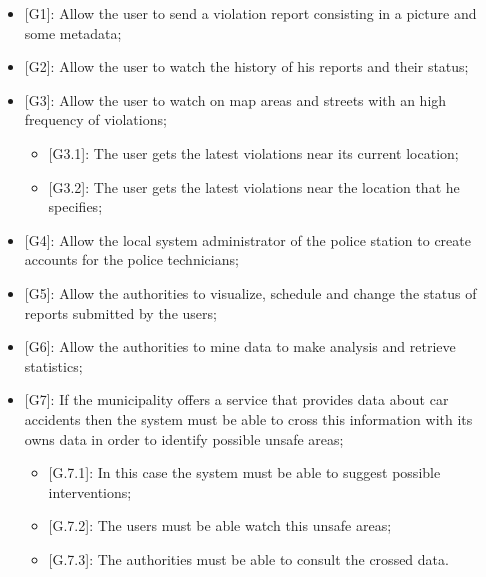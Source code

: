 \begin{itemize}  
  \item {[G1]}: Allow the user to send a violation report consisting in a picture and some metadata;
  \item {[G2]}: Allow the user to watch the history of his reports and their status;
  \item {[G3]}: Allow the user to watch on map areas and streets with an high frequency of violations;
  \begin{itemize}
    \item {[G3.1]}: The user gets the latest violations near its current location;
    \item {[G3.2]}: The user gets the latest violations near the location that he specifies;
  \end{itemize} 
  \item {[G4]}: Allow the local system administrator of the police station to create accounts for the police technicians;
  \item {[G5]}: Allow the authorities to visualize, schedule and change the status of reports submitted by the users;
  \item {[G6]}: Allow the authorities to mine data to make analysis and retrieve statistics;
  \item {[G7]}: If the municipality offers a service that provides data about car accidents then the system must be able to cross this information with its owns data in order to identify possible unsafe areas;
  \begin{itemize}
    \item {[G.7.1]}: In this case the system must be able to suggest possible interventions;
    \item {[G.7.2]}: The users must be able watch this unsafe areas;
    \item {[G.7.3]}: The authorities must be able to consult the crossed data.
  \end{itemize} 
\end{itemize}
